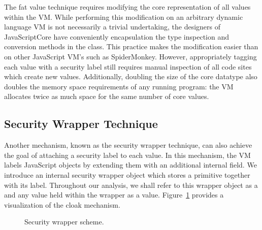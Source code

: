 The fat value technique requires modifying the core representation of all values within the VM.
While performing this modification on an arbitrary dynamic language VM is not necessarily a trivial undertaking, the designers of JavaScriptCore have conveniently encapsulation the type inspection and conversion methods in the  class.
This practice makes the modification easier than on other JavaScript VM's such as SpiderMonkey.
However, appropriately tagging each value with a security label still requires manual inspection of all code sites which create new values.
Additionally, doubling the size of the core datatype also doubles the memory space requirements of any running program: the VM allocates twice as much space for the same number of core values.

\subsection{Security Wrapper Technique}\label{sec:cloaks}

Another mechanism, known as the security wrapper technique, can also achieve the goal of attaching a security label to each value.
In this mechanism, the VM labels JavaScript objects by extending them with an additional internal field.
We introduce an internal security wrapper object which stores a primitive together with its label.
Throughout our analysis, we shall refer to this wrapper object as a  and any value held within the wrapper as a  value.
Figure~\ref{fig:security-wrapper} provides a visualization of the cloak mechanism.

\begin{figure}[h]
 \centering
{}
\caption{Security wrapper scheme.}
\label{fig:security-wrapper}
\end{figure}

